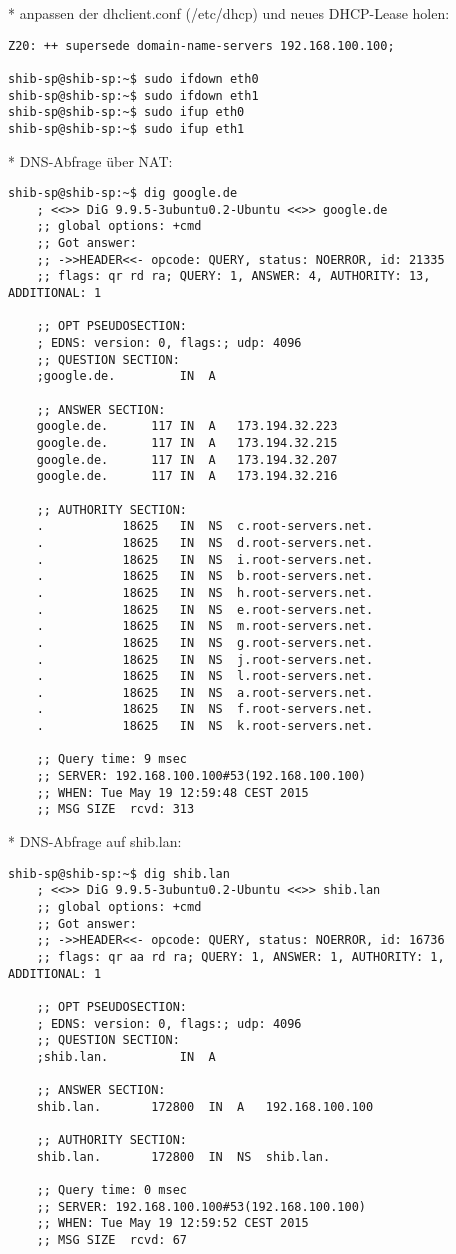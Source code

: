 * anpassen der dhclient.conf (/etc/dhcp) und neues DHCP-Lease holen:
\begin{lstlisting}
Z20: ++ supersede domain-name-servers 192.168.100.100;
		
shib-sp@shib-sp:~$ sudo ifdown eth0
shib-sp@shib-sp:~$ sudo ifdown eth1
shib-sp@shib-sp:~$ sudo ifup eth0
shib-sp@shib-sp:~$ sudo ifup eth1
\end{lstlisting}
* DNS-Abfrage über NAT:
\begin{lstlisting}
shib-sp@shib-sp:~$ dig google.de
	; <<>> DiG 9.9.5-3ubuntu0.2-Ubuntu <<>> google.de
	;; global options: +cmd
	;; Got answer:
	;; ->>HEADER<<- opcode: QUERY, status: NOERROR, id: 21335
	;; flags: qr rd ra; QUERY: 1, ANSWER: 4, AUTHORITY: 13, ADDITIONAL: 1

	;; OPT PSEUDOSECTION:
	; EDNS: version: 0, flags:; udp: 4096
	;; QUESTION SECTION:
	;google.de.			IN	A

	;; ANSWER SECTION:
	google.de.		117	IN	A	173.194.32.223
	google.de.		117	IN	A	173.194.32.215
	google.de.		117	IN	A	173.194.32.207
	google.de.		117	IN	A	173.194.32.216

	;; AUTHORITY SECTION:
	.			18625	IN	NS	c.root-servers.net.
	.			18625	IN	NS	d.root-servers.net.
	.			18625	IN	NS	i.root-servers.net.
	.			18625	IN	NS	b.root-servers.net.
	.			18625	IN	NS	h.root-servers.net.
	.			18625	IN	NS	e.root-servers.net.
	.			18625	IN	NS	m.root-servers.net.
	.			18625	IN	NS	g.root-servers.net.
	.			18625	IN	NS	j.root-servers.net.
	.			18625	IN	NS	l.root-servers.net.
	.			18625	IN	NS	a.root-servers.net.
	.			18625	IN	NS	f.root-servers.net.
	.			18625	IN	NS	k.root-servers.net.

	;; Query time: 9 msec
	;; SERVER: 192.168.100.100#53(192.168.100.100)
	;; WHEN: Tue May 19 12:59:48 CEST 2015
	;; MSG SIZE  rcvd: 313
\end{lstlisting}
* DNS-Abfrage auf shib.lan:
\begin{lstlisting}
shib-sp@shib-sp:~$ dig shib.lan
	; <<>> DiG 9.9.5-3ubuntu0.2-Ubuntu <<>> shib.lan
	;; global options: +cmd
	;; Got answer:
	;; ->>HEADER<<- opcode: QUERY, status: NOERROR, id: 16736
	;; flags: qr aa rd ra; QUERY: 1, ANSWER: 1, AUTHORITY: 1, ADDITIONAL: 1

	;; OPT PSEUDOSECTION:
	; EDNS: version: 0, flags:; udp: 4096
	;; QUESTION SECTION:
	;shib.lan.			IN	A

	;; ANSWER SECTION:
	shib.lan.		172800	IN	A	192.168.100.100

	;; AUTHORITY SECTION:
	shib.lan.		172800	IN	NS	shib.lan.

	;; Query time: 0 msec
	;; SERVER: 192.168.100.100#53(192.168.100.100)
	;; WHEN: Tue May 19 12:59:52 CEST 2015
	;; MSG SIZE  rcvd: 67
\end{lstlisting}
